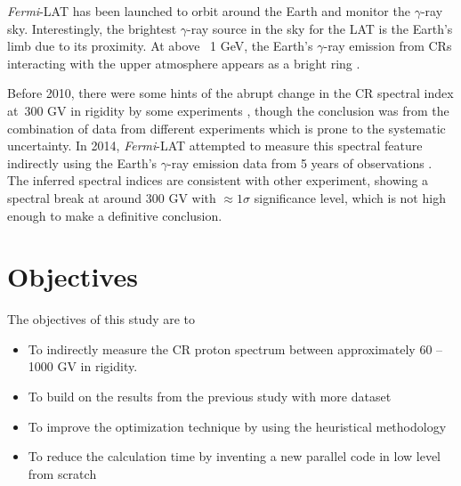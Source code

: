 \textit{Fermi}-LAT has been launched to orbit around the
Earth and monitor the $\gamma$-ray sky.
Interestingly, the brightest $\gamma$-ray source in the sky for
the LAT is the Earth's limb due to its proximity. At above ~1 GeV,
the Earth's $\gamma$-ray emission from CRs interacting with the
upper atmosphere appears as a bright ring \citep{FermiEarth09}.



Before 2010, there were some hints of the abrupt change in the CR
spectral index at~300 GV in rigidity by some experiments
\citep{adriani2011pamela,cream2004,atic2002,bess_experiment},
though the conclusion was
from the combination of data from different experiments which
is prone to the systematic uncertainty. In 2014, \textit{Fermi}-LAT
attempted to measure this spectral feature indirectly using
the Earth's $\gamma$-ray emission data from 5 years of
observations \citep{FermiEarth14}. The inferred spectral
indices are consistent with other experiment, showing a spectral
break at around 300 GV with $\approx1\sigma$ significance level,
which is not high enough to make a definitive conclusion.



\section{Objectives}
The objectives of this study are to 
\begin{itemize}
    \item To indirectly measure the CR proton spectrum between approximately 60 -- 1000 GV in rigidity.
    \item To build on the results from the previous study with more dataset
    \item To improve the optimization technique by using the heuristical methodology
    \item To reduce the calculation time by inventing a new
    parallel code in low level from scratch
\end{itemize}


